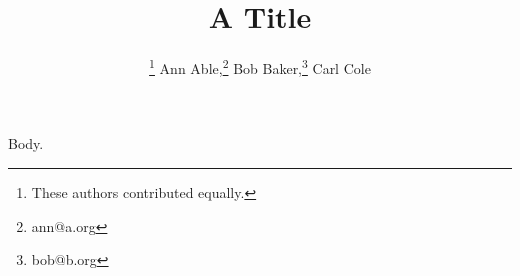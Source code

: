 \documentclass{article}
\title{A Title}
\author{\thanks{These authors contributed equally.} Ann Able,\thanks{ann@a.org} Bob Baker,\thanks{bob@b.org} Carl Cole}
\begin{document}
\maketitle Body.
\end{document}
